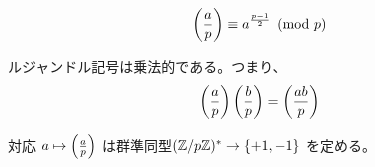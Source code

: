 \documentclass{jsarticle}
\begin{document}
  \begin{proposition}
   \begin{displaymath}
     \left(\frac{a}{p}\right) \equiv a^{\frac{p-1}{2}} \pmod p
    \end{displaymath}
  \end{proposition}
  \begin{proposition}
   \label{prop:legendre-symbol-is-multiplicative}
   ルジャンドル記号は乗法的である。つまり、
   \begin{displaymath}
    \left(\frac{a}{p}\right) \left(\frac{b}{p}\right) = \left(\frac{ab}{p}\right)
   \end{displaymath}
  \end{proposition}
  \begin{corollary}
   対応 $a \mapsto \left(\frac{a}{p}\right)$ は群準同型$(\mathbb{Z}/p\mathbb{Z})^* \to \{+1,-1\}$ を定める。
  \end{corollary}
\end{document}
